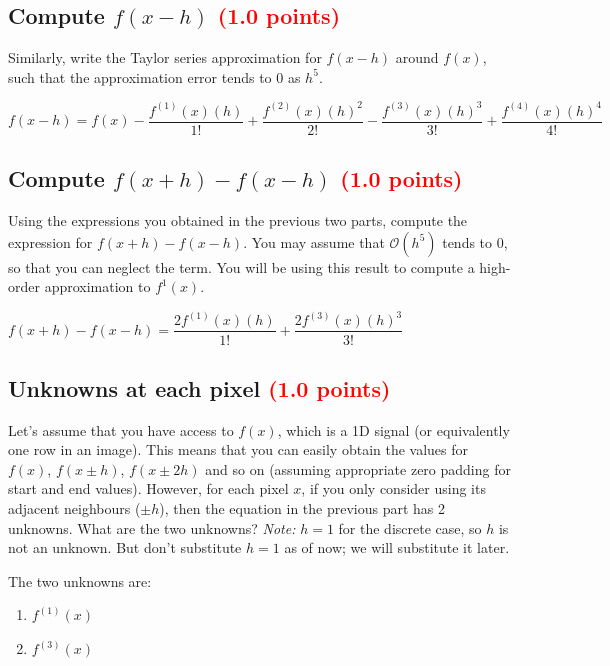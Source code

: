 \documentclass[answers]{exam}
\newcommand{\mypoints}[1]{\textcolor{red}{(#1 points)}}
\begin{document}
\subsection{Compute $f(x-h)$ \mypoints{1.0}}
Similarly, write the Taylor series approximation for $f(x-h)$ around $f(x)$, such that the approximation error tends to 0 as $h^5$.
\begin{solution}
$f(x-h) = f(x) - \dfrac{f^{(1)}(x)(h)}{1!} + \dfrac{f^{(2)}(x)(h)^2}{2!} - \dfrac{f^{(3)}(x)(h)^3}{3!}+ \dfrac{f^{(4)}(x)(h)^4}{4!}$
\end{solution}

\subsection{Compute $f(x+h)-f(x-h)$ \mypoints{1.0}}
\label{difference}
Using the expressions you obtained in the previous two parts, compute the expression for $f(x+h)-f(x-h)$. You may assume that $\mathcal{O}(h^5)$ tends to 0, so that you can neglect the term. You will be using this result to compute a high-order approximation to $f^{1}(x)$.
\begin{solution}
$f(x+h) - f(x-h) =  \dfrac{2f^{(1)}(x)(h)}{1!} + \dfrac{2f^{(3)}(x)(h)^3}{3!}$
\end{solution}

\subsection{Unknowns at each pixel \mypoints{1.0}}
\label{unknowns}
Let's assume that you have access to $f(x)$, which is a 1D signal (or equivalently one row in an image). This means that you can easily obtain the values for $f(x)$, $f(x \pm h)$, $f(x \pm 2h)$ and so on (assuming appropriate zero padding for start and end values). However, for each pixel $x$, if you only consider using its adjacent neighbours ($\pm h$), then the equation in the previous part has 2 unknowns. What are the two unknowns?
\textit{Note:} $h=1$ for the discrete case, so $h$ is not an unknown. But don't substitute $h=1$ as of now; we will substitute it later.
\begin{solution}
The two unknowns are:
\begin{enumerate}
  \item $f^{(1)}(x)$
  \item $f^{(3)}(x)$
\end{enumerate}
\end{solution}
\end{document}
